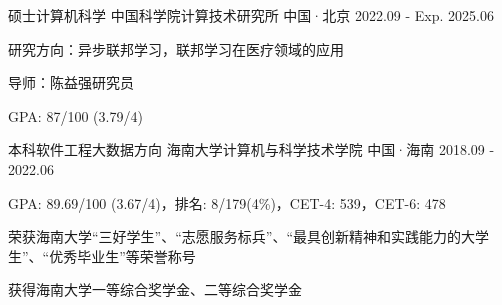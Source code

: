 

\begin{cventries}

\cventry
{硕士{\enskip\cdotp\enskip}计算机科学} %
{中国科学院{\enskip\cdotp\enskip}计算技术研究所} %
{中国·北京} %
{2022.09 - Exp. 2025.06} %
{
    \begin{cvitems} %
        \item {研究方向：异步联邦学习，联邦学习在医疗领域的应用}
        \item {导师：陈益强研究员}
        \item {GPA: 87/100 (3.79/4)}
    \end{cvitems}
}

\cventry
{本科{\enskip\cdotp\enskip}软件工程大数据方向} %
{海南大学{\enskip\cdotp\enskip}计算机与科学技术学院} %
{中国·海南} %
{2018.09 - 2022.06} %
{
    \begin{cvitems} %
        \item {GPA: 89.69/100 (3.67/4)，排名: 8/179(4\%)，CET-4: 539，CET-6: 478}
        \item {荣获海南大学“三好学生”、“志愿服务标兵”、“最具创新精神和实践能力的大学生”、“优秀毕业生”等荣誉称号}
        \item {获得海南大学一等综合奖学金、二等综合奖学金}
    \end{cvitems}
}

\end{cventries}
